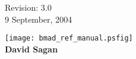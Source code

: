 \thispagestyle{empty}

\begin{flushright}
\large
  Revision: 3.0 \\
  9 September, 2004 \\
\end{flushright}

\vfill

{
\begin{center}
\texttt{[image: bmad\_ref\_manual.psfig]} \\
\vskip 0.3in
\huge\bf David Sagan
\end{center}
}


\vfill
\break
